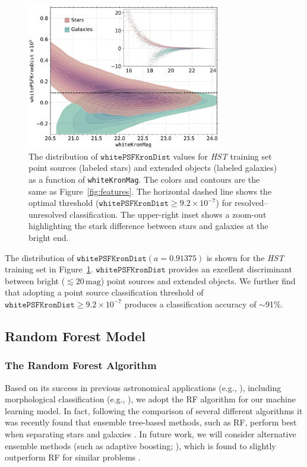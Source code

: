 \documentclass[twocolumn]{aastex62}
\begin{document}
\begin{CJK*}{UTF8}{gbsn}
\begin{figure}[t]
 \centering
  \includegraphics[width=3.35in]{./Figures/whitePSFKronDist.pdf}
  \caption{ The distribution of $\mathtt{whitePSFKronDist}$ values for
  \textit{HST} training set point sources (labeled stars) and extended
  objects (labeled galaxies) as a function of \texttt{whiteKronMag}. The
  colors and contours are the same as Figure~\ref{fig:features}. The
  horizontal dashed line shows the optimal threshold
  ($\mathtt{whitePSFKronDist} \ge 9.2 \times 10^{-7}$) for
  resolved--unresolved classification. The upper-right inset shows a
  zoom-out highlighting the stark difference between stars and galaxies at
  the bright end. }
  \label{fig:psfkrondist}
\end{figure}

The distribution of $\mathtt{whitePSFKronDist}(a=0.91375)$ is shown for the
\textit{HST} training set in Figure~\ref{fig:psfkrondist}.
$\mathtt{whitePSFKronDist}$ provides an excellent discriminant between
bright ($\lesssim 20\,\mathrm{mag}$) point sources and extended objects. We
further find that adopting a point source classification threshold of
$\mathtt{whitePSFKronDist} \ge 9.2 \times 10^{-7}$ produces a classification
accuracy of $\sim$91\%.

\subsection{Random Forest Model}\label{sec:rf_model}

\subsubsection{The Random Forest Algorithm}\label{sec:rf_alg}

Based on its success in previous astronomical applications (e.g.,
\citealt{Richards12a, Huppenkothen17, Brink13, Wright15, Goldstein15}),
including morphological classification (e.g., \citealt{Vasconcellos11,Miller17}),
we adopt the RF algorithm \citep{Breiman01} for our machine learning model.
In fact, following the comparison of several different algorithms it was
recently found that ensemble tree-based methods, such as RF, perform best
when separating stars and galaxies \citep{Sevilla18}. In future work, we
will consider alternative ensemble methods (such as adaptive boosting;
\citealt{Freund97}), which is found to slightly outperform RF for
similar problems \citep{Sevilla18}.


\end{CJK*}
\end{document}
